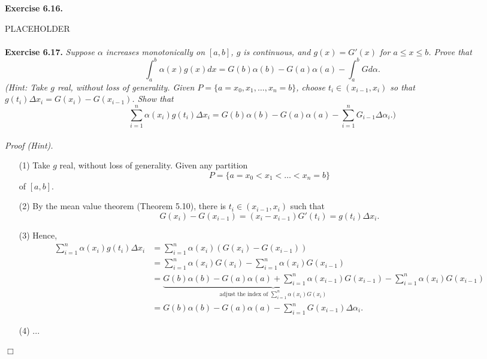 \documentclass{article}
\begin{document}
\textbf{Exercise 6.16.}

PLACEHOLDER \\\\






\textbf{Exercise 6.17.}
\emph{Suppose $\alpha$ increases monotonically on $[a,b]$,
$g$ is continuous,
and $g(x) = G'(x)$ for $a \leq x \leq b$.
Prove that
\[
  \int_{a}^{b} \alpha(x)g(x)dx
  = G(b)\alpha(b) - G(a)\alpha(a) - \int_{a}^{b}G d\alpha.
\]
(Hint: Take $g$ real, without loss of generality.
Given $P = \{a = x_0, x_1, \ldots, x_n = b\}$,
choose $t_i \in (x_{i-1},x_i)$ so that $g(t_i)\Delta x_i = G(x_i) - G(x_{i-1})$.
Show that
\[
  \sum_{i=1}^{n} \alpha(x_i)g(t_i)\Delta x_i
  = G(b)\alpha(b) - G(a)\alpha(a) - \sum_{i=1}^{n} G_{i-1}\Delta \alpha_i.)
\]} \\

\emph{Proof (Hint).}
\begin{enumerate}
  \item[(1)]
  Take $g$ real, without loss of generality.
  Given any partition
  \[
    P = \{a = x_0 < x_1 < \ldots < x_n = b\}
  \]
  of $[a,b]$.

  \item[(2)]
  By the mean value theorem (Theorem 5.10), there is $t_i \in (x_{i-1},x_i)$
  such that
  \[
    G(x_i) - G(x_{i-1}) = (x_i - x_{i-1})G'(t_i) = g(t_i)\Delta x_i.
  \]

  \item[(3)]
  Hence,
  \begin{align*}
    \sum_{i=1}^{n} \alpha(x_i)g(t_i)\Delta x_i
    &= \sum_{i=1}^{n} \alpha(x_i)(G(x_i) - G(x_{i-1})) \\
    &= \sum_{i=1}^{n} \alpha(x_i)G(x_i) - \sum_{i=1}^{n} \alpha(x_i)G(x_{i-1}) \\
    &= \underbrace{G(b)\alpha(b) - G(a)\alpha(a)
      + \sum_{i=1}^{n} \alpha(x_{i-1})G(x_{i-1})}_{\text{
        adjust the index of $\sum_{i=1}^{n} \alpha(x_i)G(x_i)$}}
      - \sum_{i=1}^{n} \alpha(x_i)G(x_{i-1}) \\
    &= G(b)\alpha(b) - G(a)\alpha(a) - \sum_{i=1}^{n} G(x_{i-1}) \Delta\alpha_i.
  \end{align*}

  \item[(4)]
  ...
\end{enumerate}
$\Box$ \\\\
\end{document}
